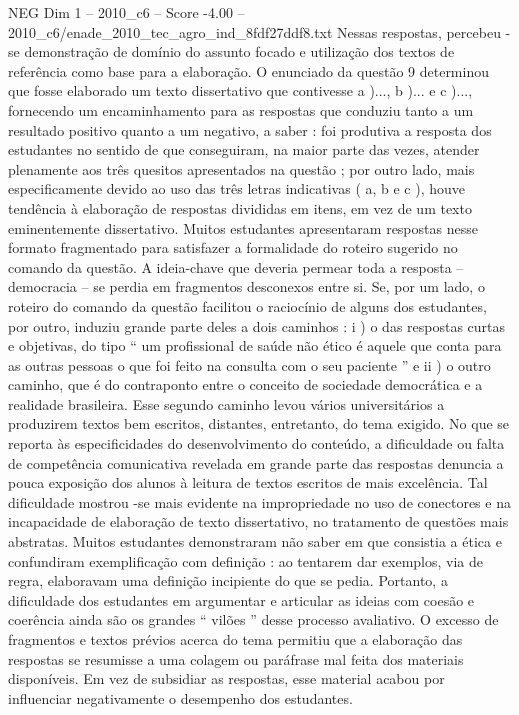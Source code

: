 \begin{textsample}{NEG Dim 1 – 2010\_c6 – Score -4.00 – 2010\_c6/enade\_2010\_tec\_agro\_ind\_8fdf27ddf8.txt}
Nessas respostas, percebeu -se demonstração de domínio do assunto focado e utilização dos textos de referência como base para a elaboração.
O enunciado da questão 9 determinou que fosse elaborado um texto dissertativo que contivesse a )..., b )... e c )..., fornecendo um encaminhamento para as respostas que conduziu tanto a um resultado positivo quanto a um negativo, a saber : foi produtiva a resposta dos estudantes no sentido de que conseguiram, na maior parte das vezes, atender plenamente aos três quesitos apresentados na questão ; por outro lado, mais especificamente devido ao uso das três letras indicativas ( a, b e c ), houve tendência à elaboração de respostas divididas em itens, em vez de um texto eminentemente dissertativo.
Muitos estudantes apresentaram respostas nesse formato fragmentado para satisfazer a formalidade do roteiro sugerido no comando da questão.
A ideia-chave que deveria permear toda a resposta – democracia – se perdia em fragmentos desconexos entre si.
Se, por um lado, o roteiro do comando da questão facilitou o raciocínio de alguns dos estudantes, por outro, induziu grande parte deles a dois caminhos : i ) o das respostas curtas e objetivas, do tipo “ um profissional de saúde não ético é aquele que conta para as outras pessoas o que foi feito na consulta com o seu paciente ” e ii ) o outro caminho, que é do contraponto entre o conceito de sociedade democrática e a realidade brasileira.
Esse segundo caminho levou vários universitários a produzirem textos bem escritos, distantes, entretanto, do tema exigido.
No que se reporta às especificidades do desenvolvimento do conteúdo, a dificuldade ou falta de competência comunicativa revelada em grande parte das respostas denuncia a pouca exposição dos alunos à leitura de textos escritos de mais excelência.
Tal dificuldade mostrou -se mais evidente na impropriedade no uso de conectores e na incapacidade de elaboração de texto dissertativo, no tratamento de questões mais abstratas.
Muitos estudantes demonstraram não saber em que consistia a ética e confundiram exemplificação com definição : ao tentarem dar exemplos, via de regra, elaboravam uma definição incipiente do que se pedia.
Portanto, a dificuldade dos estudantes em argumentar e articular as ideias com coesão e coerência ainda são os grandes “ vilões ” desse processo avaliativo.
O excesso de fragmentos e textos prévios acerca do tema permitiu que a elaboração das respostas se resumisse a uma colagem ou paráfrase mal feita dos materiais disponíveis.
Em vez de subsidiar as respostas, esse material acabou por influenciar negativamente o desempenho dos estudantes.

\end{textsample}
